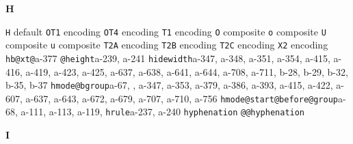 \documentclass[twoside]{ltxdoc}
\makeatletter
\renewenvironment{theindex}{%
   \@restonecoltrue
   \if@twocolumn\@restonecolfalse\fi
   \columnseprule \z@
   \columnsep 35\p@
   \twocolumn[\index@prologue]%
   \IndexParms
   \let\item\@idxitem
   \ignorespaces
}{\if@restonecol\onecolumn\else\clearpage\fi}
\makeatother
\begin{document}
\begin{theindex}
  \indexspace
{\bfseries\hfil H\hfil}\nopagebreak

  \item \texttt  {H}\efill 
    \subitem default\pfill {}
    \subitem \texttt  {OT1} encoding\pfill {}
    \subitem \texttt  {OT4} encoding\pfill {}
    \subitem \texttt  {T1} encoding\pfill {}
      \subsubitem \texttt  {O} composite\pfill {}
      \subsubitem \texttt  {o} composite\pfill {}
      \subsubitem \texttt  {U} composite\pfill {}
      \subsubitem \texttt  {u} composite\pfill {}
    \subitem \texttt  {T2A} encoding\pfill {}
    \subitem \texttt  {T2B} encoding\pfill {}
    \subitem \texttt  {T2C} encoding\pfill {}
    \subitem \texttt  {X2} encoding\pfill {}
  \item \texttt  {hb@xt@}\pfill a-377
  \item \texttt  {@height}\pfill a-239, a-241
  \item \texttt  {hidewidth}\pfill a-347, a-348, a-351, 
                a-354, a-415, a-416, a-419, a-423, a-425, a-637, a-638, 
                a-641, a-644, a-708, a-711, b-28, b-29, b-32, b-35, 
                b-37
  \item \texttt  {hmode@bgroup}\pfill a-67, , 
                a-347, a-353, a-379, a-386, a-393, a-415, a-422, a-607, 
                a-637, a-643, a-672, a-679, a-707, a-710, a-756
  \item \texttt  {hmode@start@before@group}\pfill a-68, 
                a-111, a-113, a-119, 
  \item \texttt  {hrule}\pfill a-237, a-240
  \item \texttt  {hyphenation}\pfill {}
  \item \texttt  {@@hyphenation}\pfill {}

  \indexspace
{\bfseries\hfil I\hfil}\nopagebreak


\end{theindex}
\end{document}
